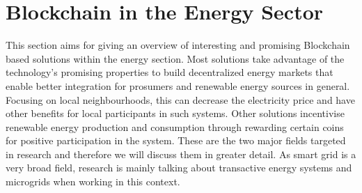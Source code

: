 \documentclass[runningheads]{llncs}
\begin{document}
\section{Blockchain in the Energy Sector}
This section aims for giving an overview of interesting and promising Blockchain based solutions within the energy section. Most solutions take advantage of the technology's promising properties to build decentralized energy markets that enable better integration for prosumers and renewable energy sources in general. Focusing on local neighbourhoods, this can decrease the electricity price and have other benefits for local participants in such systems. Other solutions incentivise renewable energy production and consumption through rewarding certain coins for positive participation in the system. These are the two major fields targeted in research and therefore we will discuss them in greater detail. As smart grid is a very broad field, research is mainly talking about transactive energy systems and microgrids when working in this context.
\end{document}
